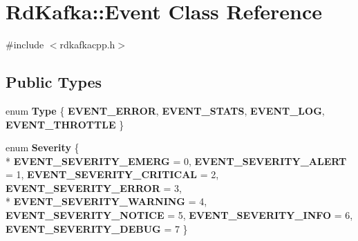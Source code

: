 \hypertarget{classRdKafka_1_1Event}{\section{Rd\-Kafka\-:\-:Event Class Reference}
\label{classRdKafka_1_1Event}
}


{\ttfamily \#include $<$rdkafkacpp.\-h$>$}

\subsection*{Public Types}
\begin{DoxyCompactItemize}
\item 
enum {\bfseries Type} \{ {\bfseries E\-V\-E\-N\-T\-\_\-\-E\-R\-R\-O\-R}, 
{\bfseries E\-V\-E\-N\-T\-\_\-\-S\-T\-A\-T\-S}, 
{\bfseries E\-V\-E\-N\-T\-\_\-\-L\-O\-G}, 
{\bfseries E\-V\-E\-N\-T\-\_\-\-T\-H\-R\-O\-T\-T\-L\-E}
 \}
\item 
enum {\bfseries Severity} \{ \\*
{\bfseries E\-V\-E\-N\-T\-\_\-\-S\-E\-V\-E\-R\-I\-T\-Y\-\_\-\-E\-M\-E\-R\-G} = 0, 
{\bfseries E\-V\-E\-N\-T\-\_\-\-S\-E\-V\-E\-R\-I\-T\-Y\-\_\-\-A\-L\-E\-R\-T} = 1, 
{\bfseries E\-V\-E\-N\-T\-\_\-\-S\-E\-V\-E\-R\-I\-T\-Y\-\_\-\-C\-R\-I\-T\-I\-C\-A\-L} = 2, 
{\bfseries E\-V\-E\-N\-T\-\_\-\-S\-E\-V\-E\-R\-I\-T\-Y\-\_\-\-E\-R\-R\-O\-R} = 3, 
\\*
{\bfseries E\-V\-E\-N\-T\-\_\-\-S\-E\-V\-E\-R\-I\-T\-Y\-\_\-\-W\-A\-R\-N\-I\-N\-G} = 4, 
{\bfseries E\-V\-E\-N\-T\-\_\-\-S\-E\-V\-E\-R\-I\-T\-Y\-\_\-\-N\-O\-T\-I\-C\-E} = 5, 
{\bfseries E\-V\-E\-N\-T\-\_\-\-S\-E\-V\-E\-R\-I\-T\-Y\-\_\-\-I\-N\-F\-O} = 6, 
{\bfseries E\-V\-E\-N\-T\-\_\-\-S\-E\-V\-E\-R\-I\-T\-Y\-\_\-\-D\-E\-B\-U\-G} = 7
 \}
\end{DoxyCompactItemize}
